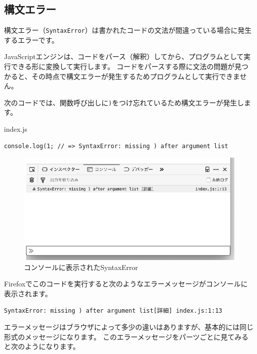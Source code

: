 \hypertarget{syntax-error}{%
\subsection{構文エラー}\label{syntax-error}}

構文エラー（\texttt{SyntaxError}）は書かれたコードの文法が間違っている場合に発生するエラーです。

JavaScriptエンジンは、コードをパース（解釈）してから、プログラムとして実行できる形に変換して実行します。
コードをパースする際に文法の問題が見つかると、その時点で構文エラーが発生するためプログラムとして実行できません。

次のコードでは、関数呼び出しに\texttt{)}をつけ忘れているため構文エラーが発生します。

\begin{listtitle}
index.js
\end{listtitle}
\begin{lstlisting}
console.log(1; // => SyntaxError: missing ) after argument list
\end{lstlisting}
\listend
\newpage
\begin{figure}
\centering
\includegraphics[width=140mm]{./fig/syntax-error.eps}
\caption{コンソールに表示されたSyntaxError}
\end{figure}

Firefoxでこのコードを実行すると次のようなエラーメッセージがコンソールに表示されます。

\begin{lstlisting}
SyntaxError: missing ) after argument list[詳細] index.js:1:13
\end{lstlisting}

エラーメッセージはブラウザによって多少の違いはありますが、基本的には同じ形式のメッセージになります。
このエラーメッセージをパーツごとに見てみると次のようになります。

